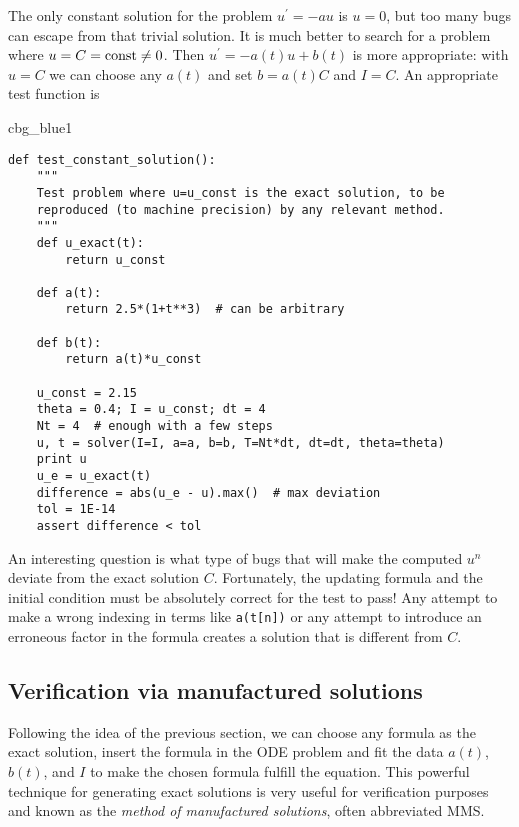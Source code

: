 \documentclass[graybox,sectrefs,envcountresetchap,open=right,final]{svmonodo}
\newenvironment{_cod_tight}[1]{
   \def\FrameCommand{\colorbox{#1}}
   \FrameRule0.6pt\MakeFramed {\FrameRestore}\vskip3mm}
   {\vskip0mm\endMakeFramed}
\newenvironment{cod}[1]{
\bgroup\rmfamily
\fboxsep=0mm\relax
\begin{_cod_tight}{#1}
\list{}{\parsep=-2mm\parskip=0mm\topsep=0pt\leftmargin=2mm
\rightmargin=2\leftmargin\leftmargin=4pt\relax}
\item\relax}
{\endlist\end{_cod_tight}\egroup}
\begin{document}
The only constant solution for the problem $u^{\prime}=-au$ is $u=0$, but too
many bugs can escape from that trivial solution.  It is much better to
search for a problem where $u=C=\hbox{const}\neq 0$.  Then $u^{\prime}=-a(t)u
+ b(t)$ is more appropriate: with $u=C$ we can choose any $a(t)$ and
set $b=a(t)C$ and $I=C$. An appropriate test function is

\begin{cod}{cbg_blue1}\begin{Verbatim}[numbers=none,fontsize=\fontsize{9pt}{9pt},baselinestretch=0.95,xleftmargin=2mm]
def test_constant_solution():
    """
    Test problem where u=u_const is the exact solution, to be
    reproduced (to machine precision) by any relevant method.
    """
    def u_exact(t):
        return u_const

    def a(t):
        return 2.5*(1+t**3)  # can be arbitrary

    def b(t):
        return a(t)*u_const

    u_const = 2.15
    theta = 0.4; I = u_const; dt = 4
    Nt = 4  # enough with a few steps
    u, t = solver(I=I, a=a, b=b, T=Nt*dt, dt=dt, theta=theta)
    print u
    u_e = u_exact(t)
    difference = abs(u_e - u).max()  # max deviation
    tol = 1E-14
    assert difference < tol
\end{Verbatim}
\end{cod}
\noindent

An interesting question is what type of bugs that will make the
computed $u^n$ deviate from the exact solution $C$.
Fortunately, the updating formula and the initial condition must
be absolutely correct for the test to pass! Any attempt to make
a wrong indexing in terms like \texttt{a(t[n])} or any attempt to
introduce an erroneous factor in the formula creates a solution
that is different from $C$.


\subsection{Verification via manufactured solutions}
\label{decay:MMS}


Following the idea of the previous section, we can choose any formula
as the exact solution, insert the formula in the ODE problem and fit
the data $a(t)$, $b(t)$, and $I$ to make the chosen
formula fulfill the equation. This
powerful technique for generating exact solutions is very useful for
verification purposes and known as the \emph{method of manufactured
solutions}, often abbreviated MMS.
\end{document}
